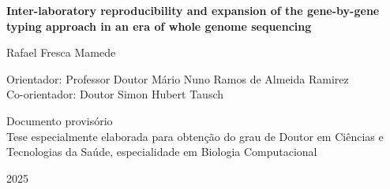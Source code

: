 \begin{titlepage}
\begin{center}
        \vspace{1cm}

        \huge
        \textbf{Inter-laboratory reproducibility and expansion of the gene-by-gene typing approach in an era of whole genome sequencing}
        \normalsize
        
        \vspace{1cm}
        
        \large
        Rafael Fresca Mamede
        \normalsize
        
        \vspace{1cm}
        
        Orientador: Professor Doutor Mário Nuno Ramos de Almeida Ramirez\\
        Co-orientador: Doutor Simon Hubert Tausch
        
        \vfill

        Documento provisório \\
        Tese especialmente elaborada para obtenção do grau de Doutor em Ciências e Tecnologias da Saúde, especialidade em Biologia Computacional\\
        
        \vspace{0.8cm}
        
        2025
        
    \end{center}
\end{titlepage}